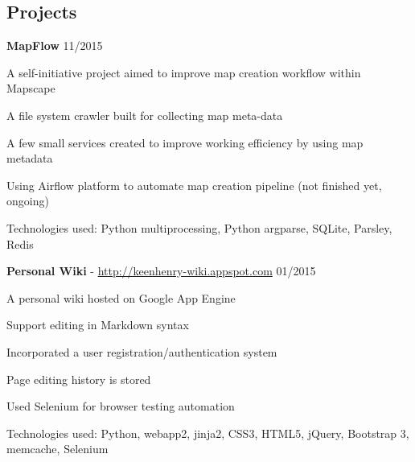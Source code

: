 \documentclass[margin,line]{resume}
\begin{document}
\begin{resume}
    \section{\myheadingstyle Projects}

    \textbf{MapFlow} \hfill 11/2015 \vspace{-3mm}\\\vspace{-1mm}%
      \begin{list2}
       \item A self-initiative project aimed to improve map creation workflow within Mapscape
       \item A file system crawler built for collecting map meta-data
       \item A few small services created to improve working efficiency by using map metadata
       \item Using Airflow platform to automate map creation pipeline (not finished yet, ongoing)
       \item Technologies used: Python multiprocessing, Python argparse, SQLite, Parsley, Redis
      \end{list2}

    \textbf{Personal Wiki} - \url{http://keenhenry-wiki.appspot.com} \hfill 01/2015 \vspace{-3mm}\\\vspace{-1mm}%
      \begin{list2}
       \item A personal wiki hosted on Google App Engine
       \item Support editing in Markdown syntax
       \item Incorporated a user registration/authentication system
       \item Page editing history is stored
       \item Used Selenium for browser testing automation
       \item Technologies used: Python, webapp2, jinja2, CSS3, HTML5, jQuery, Bootstrap 3, memcache, Selenium
      \end{list2}



\end{resume}
\end{document}
